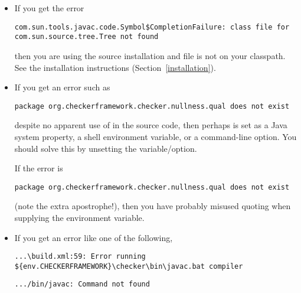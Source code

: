 \begin{itemize}
\item
If you get the error

\begin{smaller}
\begin{Verbatim}
com.sun.tools.javac.code.Symbol$CompletionFailure: class file for com.sun.source.tree.Tree not found
\end{Verbatim}
\end{smaller}

\noindent
then you are using the source installation and file  is not
on your classpath.  See the installation instructions
(Section~\ref{installation}).

\item
If you get an error such as

\begin{Verbatim}
package org.checkerframework.checker.nullness.qual does not exist
\end{Verbatim}

  \noindent
\begin{sloppypar}
  despite no apparent use of  in
  the source code, then perhaps
   is set as a Java system property, a shell
  environment variable, or a command-line option.
  You should solve this by unsetting the variable/option.
\end{sloppypar}

If the error is 

\begin{Verbatim}
package org.checkerframework.checker.nullness.qual does not exist
\end{Verbatim}

\noindent
(note the extra apostrophe!), then you have probably misused quoting when
supplying the  environment variable.

\item
If you get an error like one of the following,

\begin{smaller}
\begin{Verbatim}
...\build.xml:59: Error running ${env.CHECKERFRAMEWORK}\checker\bin\javac.bat compiler
\end{Verbatim}

\begin{Verbatim}
.../bin/javac: Command not found
\end{Verbatim}
\end{smaller}


\end{itemize}
